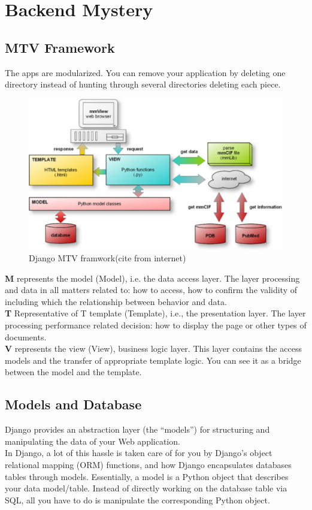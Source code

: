 \chapter{Backend Mystery} 

\section{MTV Framework}
The apps are modularized. You can remove your  application by deleting one directory instead of hunting through several directories deleting each piece. 

\begin{figure}[htb]
\centering
\includegraphics[scale=0.6]{./mtv}
\caption{Django MTV framwork(cite from internet)}
\label{fig:label} %
\end{figure}
\textbf{M} represents the model (Model), i.e. the data access layer. The layer processing and data in all matters related to: how to access, how to confirm the validity of including which the relationship between behavior and data.\\
\textbf{T} Representative of T template (Template), i.e., the presentation layer. The layer processing performance related decision: how to display the page or other types of documents.\\
\textbf{V} represents the view (View), business logic layer. This layer contains the access models and the transfer of appropriate template logic. You can see it as a bridge between the model and the template.\\
\section{Models and Database}
Django provides an abstraction layer (the “models”) for structuring and manipulating the data of your Web application. \\
In Django, a lot of this hassle is taken care of for you by Django’s object relational mapping (ORM) functions, and how Django encapsulates databases tables through models. Essentially, a model is a Python object that describes your data model/table. Instead of directly working on the database table via SQL, all you have to do is manipulate the corresponding Python object. 
